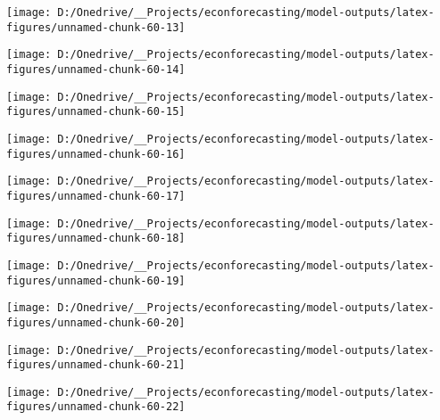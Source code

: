\documentclass[11pt, letterpaper]{article}\usepackage[]{graphicx}\usepackage[]{color}
\begin{document}
{\centering \texttt{[image: D:/Onedrive/\_\_Projects/econforecasting/model-outputs/latex-figures/unnamed-chunk-60-13]} 

}




{\centering \texttt{[image: D:/Onedrive/\_\_Projects/econforecasting/model-outputs/latex-figures/unnamed-chunk-60-14]} 

}




{\centering \texttt{[image: D:/Onedrive/\_\_Projects/econforecasting/model-outputs/latex-figures/unnamed-chunk-60-15]} 

}




{\centering \texttt{[image: D:/Onedrive/\_\_Projects/econforecasting/model-outputs/latex-figures/unnamed-chunk-60-16]} 

}




{\centering \texttt{[image: D:/Onedrive/\_\_Projects/econforecasting/model-outputs/latex-figures/unnamed-chunk-60-17]} 

}




{\centering \texttt{[image: D:/Onedrive/\_\_Projects/econforecasting/model-outputs/latex-figures/unnamed-chunk-60-18]} 

}




{\centering \texttt{[image: D:/Onedrive/\_\_Projects/econforecasting/model-outputs/latex-figures/unnamed-chunk-60-19]} 

}




{\centering \texttt{[image: D:/Onedrive/\_\_Projects/econforecasting/model-outputs/latex-figures/unnamed-chunk-60-20]} 

}




{\centering \texttt{[image: D:/Onedrive/\_\_Projects/econforecasting/model-outputs/latex-figures/unnamed-chunk-60-21]} 

}




{\centering \texttt{[image: D:/Onedrive/\_\_Projects/econforecasting/model-outputs/latex-figures/unnamed-chunk-60-22]} 

}
\end{document}
